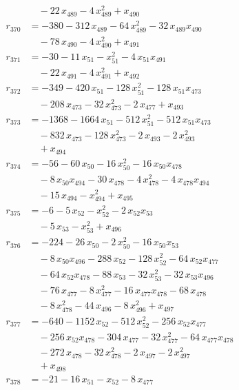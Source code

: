 \begin{align*}
&\quad{}- 22\,x_{489} - 4\,x_{489}^{2} + x_{490} \\
r_{370} &= -380 - 312\,x_{489} - 64\,x_{489}^{2} - 32\,x_{489} x_{490} \\
&\quad{}- 78\,x_{490} - 4\,x_{490}^{2} + x_{491} \\
r_{371} &= -30 - 11\,x_{51} - x_{51}^{2} - 4\,x_{51} x_{491} \\
&\quad{}- 22\,x_{491} - 4\,x_{491}^{2} + x_{492} \\
r_{372} &= -349 - 420\,x_{51} - 128\,x_{51}^{2} - 128\,x_{51} x_{473} \\
&\quad{}- 208\,x_{473} - 32\,x_{473}^{2} - 2\,x_{477} + x_{493} \\
r_{373} &= -1368 - 1664\,x_{51} - 512\,x_{51}^{2} - 512\,x_{51} x_{473} \\
&\quad{}- 832\,x_{473} - 128\,x_{473}^{2} - 2\,x_{493} - 2\,x_{493}^{2} \\
&\quad{}+ x_{494} \\
r_{374} &= -56 - 60\,x_{50} - 16\,x_{50}^{2} - 16\,x_{50} x_{478} \\
&\quad{}- 8\,x_{50} x_{494} - 30\,x_{478} - 4\,x_{478}^{2} - 4\,x_{478} x_{494} \\
&\quad{}- 15\,x_{494} - x_{494}^{2} + x_{495} \\
r_{375} &= -6 - 5\,x_{52} - x_{52}^{2} - 2\,x_{52} x_{53} \\
&\quad{}- 5\,x_{53} - x_{53}^{2} + x_{496} \\
r_{376} &= -224 - 26\,x_{50} - 2\,x_{50}^{2} - 16\,x_{50} x_{53} \\
&\quad{}- 8\,x_{50} x_{496} - 288\,x_{52} - 128\,x_{52}^{2} - 64\,x_{52} x_{477} \\
&\quad{}- 64\,x_{52} x_{478} - 88\,x_{53} - 32\,x_{53}^{2} - 32\,x_{53} x_{496} \\
&\quad{}- 76\,x_{477} - 8\,x_{477}^{2} - 16\,x_{477} x_{478} - 68\,x_{478} \\
&\quad{}- 8\,x_{478}^{2} - 44\,x_{496} - 8\,x_{496}^{2} + x_{497} \\
r_{377} &= -640 - 1152\,x_{52} - 512\,x_{52}^{2} - 256\,x_{52} x_{477} \\
&\quad{}- 256\,x_{52} x_{478} - 304\,x_{477} - 32\,x_{477}^{2} - 64\,x_{477} x_{478} \\
&\quad{}- 272\,x_{478} - 32\,x_{478}^{2} - 2\,x_{497} - 2\,x_{497}^{2} \\
&\quad{}+ x_{498} \\
r_{378} &= -21 - 16\,x_{51} - x_{52} - 8\,x_{477} \\

\end{align*}
